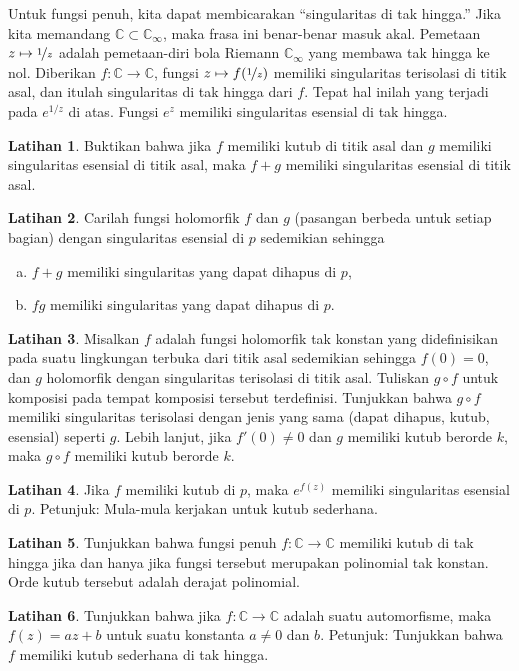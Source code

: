 \documentclass[12pt,openany]{book}
\newcommand{\C}{{\mathbb{C}}}
\newcommand{\myquote}[1]{``#1''}
\theoremstyle{plain}
\theoremstyle{remark}
\theoremstyle{definition}
\newenvironment{exbox}{%
    \def\FrameCommand{\vrule width 1pt \relax\hspace{10pt}}%
    \MakeFramed{\advance\hsize-\width\FrameRestore}%
}{%
    \endMakeFramed
}
\newenvironment{exparts}{%
    \leavevmode\begin{enumerate}[a),noitemsep,topsep=0pt,parsep=0pt,partopsep=0pt]
}{%
    \end{enumerate}
}
\theoremstyle{exercise}
\newtheorem{exercise}{Latihan}[section]
\theoremstyle{example}
\begin{document}
\medskip

Untuk fungsi penuh, kita dapat membicarakan
\myquote{singularitas di tak hingga.}
Jika kita memandang $\C \subset \C_\infty$, maka frasa ini benar-benar masuk akal.
Pemetaan $z \mapsto \nicefrac{1}{z}$ adalah pemetaan-diri bola Riemann
$\C_\infty$ yang membawa tak hingga ke nol. Diberikan $f \colon \C \to
\C$, fungsi $z \mapsto f(\nicefrac{1}{z})$ memiliki singularitas
terisolasi di titik asal, dan itulah singularitas di tak hingga
dari $f$. Tepat hal inilah yang terjadi pada $e^{1/z}$ di atas. Fungsi
$e^z$ memiliki singularitas esensial di tak hingga.

\begin{exbox}
\begin{exercise}
Buktikan bahwa jika $f$ memiliki kutub di titik asal dan $g$ memiliki singularitas
esensial di titik asal, maka $f+g$ memiliki singularitas esensial di
titik asal.
\end{exercise}

\begin{exercise}
Carilah fungsi holomorfik $f$ dan $g$ (pasangan berbeda untuk setiap bagian) dengan
singularitas esensial di $p$ sedemikian sehingga
\begin{exparts}
\item
$f+g$ memiliki singularitas yang dapat dihapus di $p$,
\item
$fg$ memiliki singularitas yang dapat dihapus di $p$.
\end{exparts}
\end{exercise}

\begin{exercise}
Misalkan $f$ adalah fungsi holomorfik tak konstan yang didefinisikan pada suatu lingkungan terbuka dari
titik asal sedemikian sehingga $f(0)=0$, dan $g$ holomorfik dengan
singularitas terisolasi di titik asal. Tuliskan $g \circ f$ untuk
komposisi pada tempat komposisi tersebut terdefinisi. Tunjukkan bahwa $g \circ f$ memiliki singularitas
terisolasi dengan jenis yang sama (dapat dihapus, kutub, esensial) seperti $g$.
Lebih lanjut, jika $f'(0) \neq 0$ dan $g$ memiliki kutub berorde $k$, maka $g \circ f$ memiliki
kutub berorde $k$.
\end{exercise}

\begin{exercise} \label{exercise:expofpole}
Jika $f$ memiliki kutub di $p$, maka $e^{f(z)}$ memiliki singularitas esensial di
$p$. Petunjuk: Mula-mula kerjakan untuk kutub sederhana.
\end{exercise}

\begin{exercise}
Tunjukkan bahwa fungsi penuh $f \colon \C \to \C$ memiliki kutub di tak hingga
jika dan hanya jika fungsi tersebut merupakan polinomial tak konstan.
Orde kutub tersebut adalah derajat polinomial.
\end{exercise}

\begin{exercise}
Tunjukkan bahwa jika $f \colon \C \to \C$ adalah suatu automorfisme, maka
$f(z) = az + b$ untuk
suatu konstanta $a \neq 0$ dan $b$. Petunjuk: Tunjukkan bahwa $f$ memiliki kutub sederhana di
tak hingga.
\end{exercise}
\end{exbox}
\end{document}
